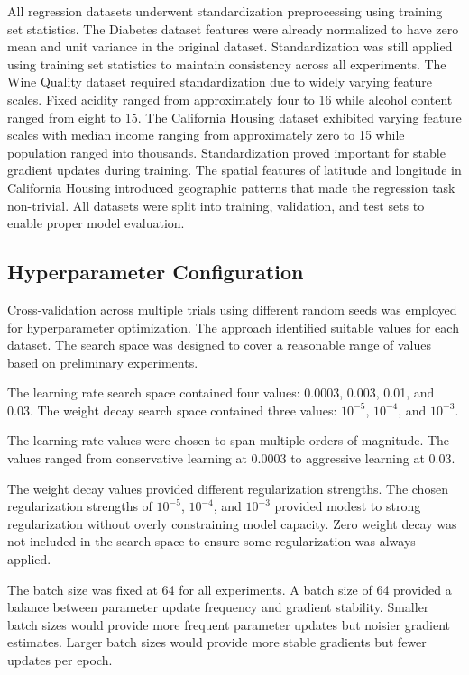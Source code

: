 \documentclass[conference]{IEEEtran}
\begin{document}
All regression datasets underwent standardization preprocessing using training set statistics. The Diabetes dataset features were already normalized to have zero mean and unit variance in the original dataset. Standardization was still applied using training set statistics to maintain consistency across all experiments. The Wine Quality dataset required standardization due to widely varying feature scales. Fixed acidity ranged from approximately four to 16 while alcohol content ranged from eight to 15. The California Housing dataset exhibited varying feature scales with median income ranging from approximately zero to 15 while population ranged into thousands. Standardization proved important for stable gradient updates during training. The spatial features of latitude and longitude in California Housing introduced geographic patterns that made the regression task non-trivial. All datasets were split into training, validation, and test sets to enable proper model evaluation.

\subsection{Hyperparameter Configuration}

Cross-validation across multiple trials using different random seeds was employed for hyperparameter optimization. The approach identified suitable values for each dataset. The search space was designed to cover a reasonable range of values based on preliminary experiments.

The learning rate search space contained four values: 0.0003, 0.003, 0.01, and 0.03. The weight decay search space contained three values: $10^{-5}$, $10^{-4}$, and $10^{-3}$.

The learning rate values were chosen to span multiple orders of magnitude. The values ranged from conservative learning at 0.0003 to aggressive learning at 0.03.

The weight decay values provided different regularization strengths. The chosen regularization strengths of $10^{-5}$, $10^{-4}$, and $10^{-3}$ provided modest to strong regularization without overly constraining model capacity. Zero weight decay was not included in the search space to ensure some regularization was always applied.

The batch size was fixed at 64 for all experiments. A batch size of 64 provided a balance between parameter update frequency and gradient stability. Smaller batch sizes would provide more frequent parameter updates but noisier gradient estimates. Larger batch sizes would provide more stable gradients but fewer updates per epoch.
\end{document}

